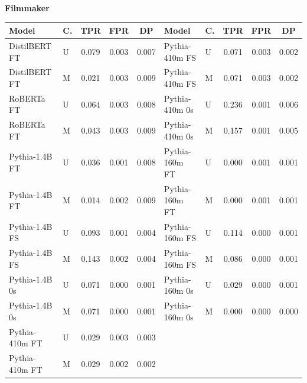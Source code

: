 \documentclass[11pt]{article}
\begin{document}
\vspace{4pt}\noindent\textbf{Filmmaker}
\begin{center}\scriptsize
\begin{tabular}{llccc|llccc}
\toprule
\textbf{Model} & \textbf{C.} & \textbf{TPR} & \textbf{FPR} & \textbf{DP} & \textbf{Model} & \textbf{C.} & \textbf{TPR} & \textbf{FPR} & \textbf{DP} \\
\midrule
DistilBERT FT & U & 0.079 & 0.003 & 0.007 & Pythia-410m FS & U & 0.071 & 0.003 & 0.002 \\
DistilBERT FT & M & 0.021 & 0.003 & 0.009 & Pythia-410m FS & M & 0.071 & 0.003 & 0.002 \\
RoBERTa FT & U & 0.064 & 0.003 & 0.008 & Pythia-410m 0s & U & 0.236 & 0.001 & 0.006 \\
RoBERTa FT & M & 0.043 & 0.003 & 0.009 & Pythia-410m 0s & M & 0.157 & 0.001 & 0.005 \\
Pythia-1.4B FT & U & 0.036 & 0.001 & 0.008 & Pythia-160m FT & U & 0.000 & 0.001 & 0.001 \\
Pythia-1.4B FT & M & 0.014 & 0.002 & 0.009 & Pythia-160m FT & M & 0.000 & 0.001 & 0.001 \\
Pythia-1.4B FS & U & 0.093 & 0.001 & 0.004 & Pythia-160m FS & U & 0.114 & 0.000 & 0.001 \\
Pythia-1.4B FS & M & 0.143 & 0.002 & 0.004 & Pythia-160m FS & M & 0.086 & 0.000 & 0.001 \\
Pythia-1.4B 0s & U & 0.071 & 0.000 & 0.001 & Pythia-160m 0s & U & 0.029 & 0.000 & 0.001 \\
Pythia-1.4B 0s & M & 0.071 & 0.000 & 0.001 & Pythia-160m 0s & M & 0.000 & 0.000 & 0.000 \\
Pythia-410m FT & U & 0.029 & 0.003 & 0.003 & & & & & \\
Pythia-410m FT & M & 0.029 & 0.002 & 0.002 & & & & & \\
\bottomrule
\end{tabular}
\end{center}
\end{document}
